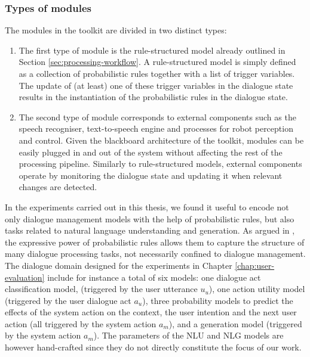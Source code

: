 \subsubsection*{Types of modules}

The modules in the \opendial toolkit are divided in two distinct types: \begin{enumerate}
\item  The first type of module is the rule-structured model already outlined in Section \ref{sec:processing-workflow}.  A rule-structured model is simply defined as a collection of probabilistic rules together with a list of trigger variables.  The update of (at least) one of these trigger variables in the dialogue state results in the instantiation of the probabilistic rules in the dialogue state. 
\item The second type of module corresponds to external components such as the speech recogniser, text-to-speech engine and processes for robot perception and control. Given the blackboard architecture of the toolkit, modules can be easily plugged in and out of the system without affecting the rest of the processing pipeline. Similarly to rule-structured models, external components operate by monitoring the dialogue state and updating it when relevant changes are detected. 

\end{enumerate}

In the experiments carried out in this thesis, we found it useful to encode not only dialogue management models with the help of probabilistic rules, but also tasks related to natural language understanding and generation. As argued in \cite{lison-semdial2012}, the expressive power of probabilistic rules allows them to capture the structure of many dialogue processing tasks, not necessarily confined to dialogue management. The dialogue domain designed for the experiments in Chapter \ref{chap:user-evaluation} include for instance a total of six models: one dialogue act classification model, (triggered by the user utterance $u_u$), one action utility model (triggered by the user dialogue act $a_u$), three probability models to predict the effects of the system action on the context, the user intention and the next user action (all triggered by the system action $a_m$), and a generation model (triggered by the system action $a_m$). The parameters of the NLU and NLG models are however hand-crafted since they do not directly constitute the focus of our work.

